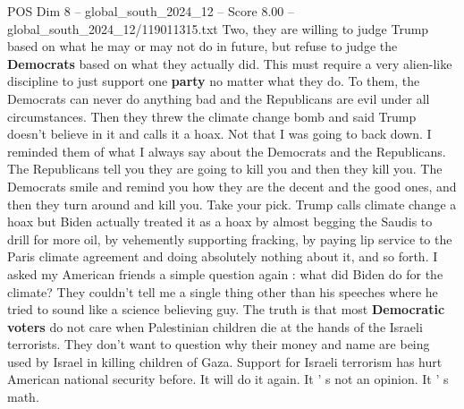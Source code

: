 \begin{textsample}{POS Dim 8 – global\_south\_2024\_12 – Score 8.00 – global\_south\_2024\_12/119011315.txt}
Two, they are willing to judge Trump based on what he may or may not do in future, but refuse to judge the \textbf{Democrats} based on what they actually did.
This must require a very alien-like discipline to just support one \textbf{party} no matter what they do.
To them, the Democrats can never do anything bad and the Republicans are evil under all circumstances.
Then they threw the climate change bomb and said Trump doesn't believe in it and calls it a hoax.
Not that I was going to back down.
I reminded them of what I always say about the Democrats and the Republicans.
The Republicans tell you they are going to kill you and then they kill you.
The Democrats smile and remind you how they are the decent and the good ones, and then they turn around and kill you.
Take your pick.
Trump calls climate change a hoax but Biden actually treated it as a hoax by almost begging the Saudis to drill for more oil, by vehemently supporting fracking, by paying lip service to the Paris climate agreement and doing absolutely nothing about it, and so forth.
I asked my American friends a simple question again : what did Biden do for the climate?
They couldn't tell me a single thing other than his speeches where he tried to sound like a science believing guy.
The truth is that most \textbf{Democratic} \textbf{voters} do not care when Palestinian children die at the hands of the Israeli terrorists.
They don't want to question why their money and name are being used by Israel in killing children of Gaza.
Support for Israeli terrorism has hurt American national security before.
It will do it again.
It ' s not an opinion.
It ' s math.

\end{textsample}

